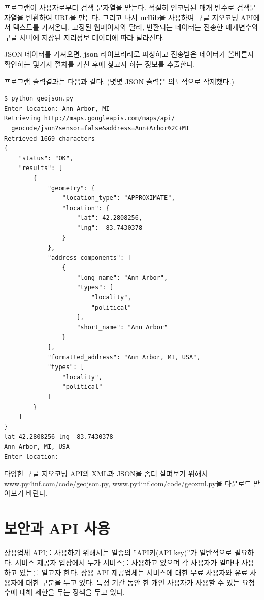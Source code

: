 프로그램이 사용자로부터 검색 문자열을 받는다. 
적절히 인코딩된 매개 변수로 검색문자열을 변환하여 URL을 만든다.
그리고 나서 {\bf urllib}을 사용하여 구글 지오코딩 API에서 텍스트를 가져온다.
고정된 웹페이지와 달리, 반환되는 데이터는 전송한 매개변수와 구글 서버에 저장된 지리정보 데이터에 따라 달라진다.

JSON 데이터를 가져오면, {\bf json} 라이브러리로 파싱하고 전송받은 데이터가 올바른지 확인하는 몇가지 절차를 거친 후에 찾고자 하는 정보를 추출한다.

프로그램 출력결과는 다음과 같다. (몇몇 JSON 출력은 의도적으로 삭제했다.)

\beforeverb
\begin{verbatim}
$ python geojson.py
Enter location: Ann Arbor, MI
Retrieving http://maps.googleapis.com/maps/api/
  geocode/json?sensor=false&address=Ann+Arbor%2C+MI
Retrieved 1669 characters
{
    "status": "OK", 
    "results": [
        {
            "geometry": {
                "location_type": "APPROXIMATE", 
                "location": {
                    "lat": 42.2808256, 
                    "lng": -83.7430378
                }
            }, 
            "address_components": [
                {
                    "long_name": "Ann Arbor", 
                    "types": [
                        "locality", 
                        "political"
                    ], 
                    "short_name": "Ann Arbor"
                } 
            ], 
            "formatted_address": "Ann Arbor, MI, USA", 
            "types": [
                "locality", 
                "political"
            ]
        }
    ]
}
lat 42.2808256 lng -83.7430378
Ann Arbor, MI, USA
Enter location:
\end{verbatim}
\afterverb
%

다양한 구글 지오코딩 API의 XML과 JSON을 좀더 살펴보기 위해서 \url{www.py4inf.com/code/geojson.py}, \url{www.py4inf.com/code/geoxml.py}을 다운로드 받아보기 바란다.

\section{보안과 API 사용}

상용업체 API를 사용하기 위해서는 일종의 ''API키(API key)''가 일반적으로 필요하다.
서비스 제공자 입장에서 누가 서비스를 사용하고 있으며 각 사용자가 얼마나 사용하고 있는를 알고자 한다.
상용 API 제공업체는 서비스에 대한 무료 사용자와 유료 사용자에 대한 구분을 두고 있다.
특정 기간 동안 한 개인 사용자가 사용할 수 있는 요청수에 대해 제한을 두는 정책을 두고 있다. 


